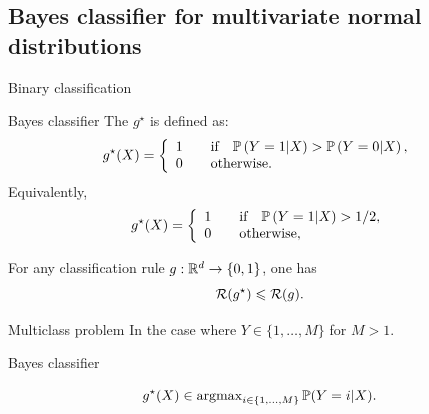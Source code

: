 \documentclass[xcolor={usenames,dvipsnames},handout]{beamer}
\begin{document}
\subsection{Bayes classifier for multivariate normal distributions}

\begin{frame}{Binary classification}

\begin{block}{Bayes classifier} 
The  $g^\star$ is defined as:
$$
g^{\star}(X) =
\left\{
	\begin{array}{cc}
		1 &\quad \text{if} \quad \P \left( Y=1 | X \right) > \P \left( Y=0 | X \right), \\
		0 &\quad \text{otherwise}. \hfill
	\end{array}
\right.
$$
Equivalently,
$$
g^{\star}(X) =
\left\{
	\begin{array}{cc}
		1 &\quad \text{if} \quad \P \left( Y=1 | X \right)> 1/2, \\
		0 &\quad \text{otherwise}, \hfill
	\end{array}
\right.
$$
\end{block}
\begin{lemma}
For any classification rule $g :  \mathbb{R}^d \to \{0,1\}$, one has
$$
{\mathcal{R}}(g^\star) \leqslant {\mathcal{R}}(g).
$$
\end{lemma}
\end{frame}

\begin{frame}{Multiclass problem}
In the case where \alert{$Y\in \{1,\ldots,M\}$ for $M>1$}.

\vspace{.5cm}

\begin{exampleblock}{Bayes classifier}

	$$
		g^\star(X) \in \operatorname{argmax}_{i \in \{1,\ldots,M\}}\mathbb{P} (Y=i | X).
	$$
\end{exampleblock}
\end{frame}
	
\end{document}
